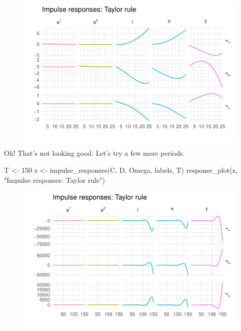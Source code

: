 \documentclass[
  letterpaper,
]{book}
\newenvironment{Shaded}{\begin{snugshade}}{\end{snugshade}}
\newcommand{\DecValTok}[1]{\textcolor[rgb]{0.68,0.00,0.00}{#1}}
\newcommand{\FunctionTok}[1]{\textcolor[rgb]{0.28,0.35,0.67}{#1}}
\newcommand{\NormalTok}[1]{\textcolor[rgb]{0.00,0.23,0.31}{#1}}
\newcommand{\OtherTok}[1]{\textcolor[rgb]{0.00,0.23,0.31}{#1}}
\newcommand{\StringTok}[1]{\textcolor[rgb]{0.13,0.47,0.30}{#1}}
\begin{document}
\begin{figure}[H]

{\centering \includegraphics{./BK_files/figure-pdf/unnamed-chunk-4-1.pdf}

}

\end{figure}

Oh! That's not looking good. Let's try a few more periods.

\begin{Shaded}
\begin{Highlighting}[]
\NormalTok{T }\OtherTok{\textless{}{-}} \DecValTok{150}
\NormalTok{z }\OtherTok{\textless{}{-}} \FunctionTok{impulse\_responses}\NormalTok{(C, D, Omega, labels, T)}
\FunctionTok{response\_plot}\NormalTok{(z, }\StringTok{"Impulse responses: Taylor rule"}\NormalTok{)}
\end{Highlighting}
\end{Shaded}

\begin{figure}[H]

{\centering \includegraphics{./BK_files/figure-pdf/unnamed-chunk-5-1.pdf}

}

\end{figure}
\end{document}
